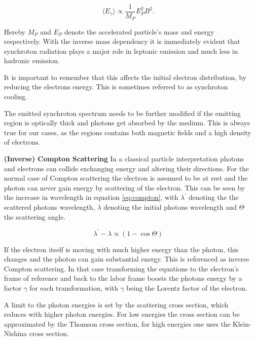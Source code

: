 \begin{equation}
	\langle E_{\gamma} \rangle \propto \frac{1}{M_P} E_P^2 B^2.
	\label{eq:synchroton}
\end{equation}

Hereby $M_P$ and $E_P$ denote the accelerated particle's 
mass and energy respectively. With the inverse mass dependency 
it is immediately evident that 
synchroton radiation plays a major role in leptonic 
emission and much less in hadronic emission.

It is important to remember that this affects the 
initial electron distribution, by reducing the electrons energy.
This is sometimes referred to as synchroton cooling.

The emitted synchroton spectrum needs to be further modified 
if the emitting region is optically thick and photons 
get absorbed by the medium.
This is always true for our cases, as the regions contains 
both magnetic fields and a high density of electrons.

\textbf{(Inverse) Compton Scattering}
In a classical particle interpretation photons and electrons 
can collide exchanging energy and altering their directions.
For the normal case of Compton scattering the electron 
is assumed to be at rest and the photon can never gain 
energy by scattering of the electron.
This can be 
seen by the increase in wavelength in equation \ref{eq:compton},
with $\lambda^{\prime}$ denoting the the scattered photons 
wavelength, $\lambda$ denoting the initial photons wavelength  
and $\Theta$ the scattering angle.

\begin{equation}
	\lambda^{\prime} - \lambda  \propto \left(1-\cos{\Theta} \right)
	\label{eq:compton}
\end{equation}


If the electron itself is moving with much higher energy
than the photon, this changes and the photon can gain substantial energy.
This is referenced as inverse Compton scattering.
In that case transforming the equations to the 
electron's frame of reference and back to the labor frame 
boosts the photons energy by a factor $\gamma$ for each transformation, 
with $\gamma$ being the Lorentz factor of the electron.

A limit to the photon energies is set by the scattering cross
section, which reduces with higher photon energies.
For low energies the cross section can be approximated by 
the Thomson cross section, for high energies
one uses the Klein-Nishina cross section.

